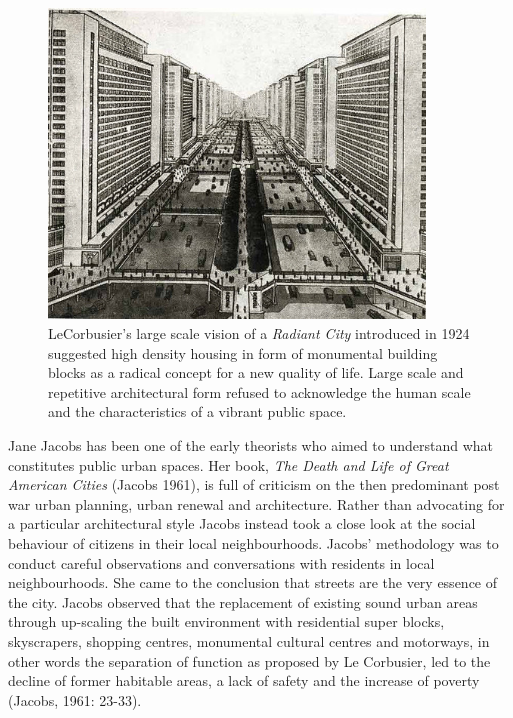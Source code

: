 
\begin{figure}[h] 
\centering
\includegraphics[width=10cm]{Illustrations/ville_radieuse.jpg}
\caption [The Radiant City, LeCorbusier (1924)] {LeCorbusier's large scale vision of a \textit{Radiant City}  introduced in 1924 suggested high density housing in form of monumental building blocks as a radical concept for a new quality of life. Large scale and repetitive architectural form refused to acknowledge the human scale and the characteristics of a vibrant public space.}
\label{RadiantCity}
\end{figure}



 
Jane Jacobs  has been one of the early theorists who aimed to understand what constitutes public urban spaces.
Her book, \textit{The Death and Life of Great American Cities} (Jacobs 1961), is full of criticism on the then predominant post war urban planning, urban renewal and architecture. 
Rather than advocating for a particular architectural style Jacobs instead took a close look at the social behaviour of citizens in their local neighbourhoods. 
Jacobs' methodology was to conduct careful observations and conversations with residents in local neighbourhoods. 
She came to the conclusion that streets are the very essence of the city. 
Jacobs observed that the replacement of existing sound urban areas through up-scaling the built environment with residential super blocks, skyscrapers, shopping centres, monumental cultural centres and motorways, in other words the separation of function as proposed by Le Corbusier, led to the decline of former habitable areas, a lack of safety and the increase of poverty (Jacobs, 1961: 23-33).

